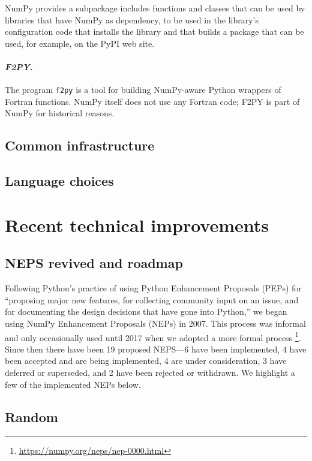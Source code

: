 \documentclass[fleqn,10pt]{wlscirep}
\newcommand{\code}[1]{\texttt{#1}}
\begin{document}
NumPy provides a subpackage includes functions and classes
that can be used by libraries that have NumPy as dependency,
to be used in the library's configuration code that installs the
library and that builds a package that can be used, for example,
on the PyPI web site.

\paragraph{\emph{F2PY.}}  The program \code{f2py} is a tool for
building NumPy-aware Python wrappers of Fortran functions.
NumPy itself does not use any Fortran code;  F2PY is part of NumPy
for historical reasons.

\subsection*{Common infrastructure}


\subsection*{Language choices}

\section*{Recent technical improvements}

\subsection*{NEPS revived and roadmap}

Following Python's practice of using Python Enhancement Proposals (PEPs) for
``proposing major new features, for collecting community input on an
issue, and for documenting the design decisions that have gone into Python,''
we began using NumPy Enhancement Proposals (NEPs) in 2007.
This process was informal and only occasionally used until 2017 when
we adopted a more formal process \footnote{\url{https://numpy.org/neps/nep-0000.html}}.
Since then there have been 19 proposed NEPS---6 have been implemented,
4 have been accepted and are being implemented, 4 are under consideration,
3 have deferred or superseded, and 2 have been rejected or withdrawn.
We highlight a few of the implemented NEPs below.

\subsection*{Random}
\end{document}
